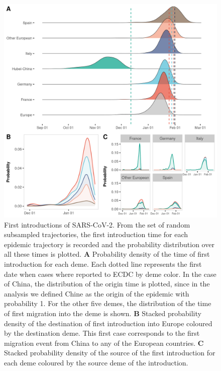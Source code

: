 \documentclass[12pt]{article}
\begin{document}
\begin{figure}[p]
    \centering
    \includegraphics[width=\textwidth]{201030_europe3_figtraj04.png}
    \caption{First introductions of SARS-CoV-2. From the set of random subsampled trajectories, the first introduction time for each epidemic trajectory is recorded and the probability distribution over all these times is plotted. \textbf{A} Probability density of the time of first introduction for each deme. Each dotted line represents the first date when cases where reported to ECDC by deme color. In the case of China, the distribution of the origin time is plotted, since in the analysis we defined Chine as the origin of the epidemic with probability 1. For the other five demes, the distribution of the time of first migration into the deme is shown. \textbf{B} Stacked probability density of the destination of first introduction into Europe coloured by the destination deme. This first case corresponds to the first migration event from China to any of the European countries. \textbf{C} Stacked probability density of the source of the first introduction for each deme coloured by the source deme of the introduction.}
    \label{fig:first}
\end{figure}
\end{document}

